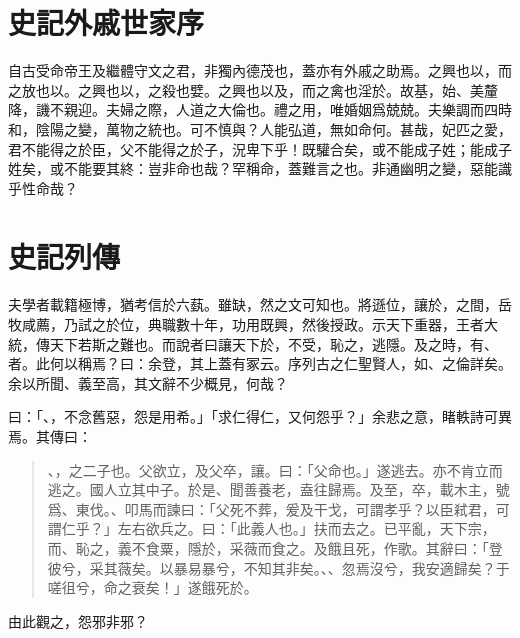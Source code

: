 \section[外戚世家序\quad{\small 史記}]{{\normalsize 史記}\quad 外戚世家序}
自古受命帝王及繼體守文之君，非獨內德茂也，蓋亦有外戚之助焉。之興也以，而之放也以。之興也以，之殺也嬖。之興也以及，而之禽也淫於。故基，始、美釐降，譏不親迎。夫婦之際，人道之大倫也。禮之用，唯婚姻爲兢兢。夫樂調而四時和，陰陽之變，萬物之統也。可不慎與？人能弘道，無如命何。甚哉，妃匹之愛，君不能得之於臣，父不能得之於子，況卑下乎！既驩合矣，或不能成子姓；能成子姓矣，或不能要其終：豈非命也哉？罕稱命，蓋難言之也。非通幽明之變，惡能識乎性命哉？

\theendnotes

\section[伯夷列傳\quad{\small 史記}]{{\normalsize 史記}\quad{}列傳}
夫學者載籍極博，猶考信於六蓺。雖缺，然之文可知也。將遜位，讓於，之間，岳牧咸薦，乃試之於位，典職數十年，功用既興，然後授政。示天下重器，王者大統，傳天下若斯之難也。而說者曰讓天下於，不受，恥之，逃隱。及之時，有、者。此何以稱焉？曰：余登，其上蓋有冢云。序列古之仁聖賢人，如、之倫詳矣。余以所聞、義至高，其文辭不少概見，何哉？

曰：「、，不念舊惡，怨是用希。」「求仁得仁，又何怨乎？」余悲之意，睹軼詩可異焉。其傳曰：
\begin{quotation}
、，之二子也。父欲立，及父卒，讓。曰：「父命也。」遂逃去。亦不肯立而逃之。國人立其中子。於是、聞善養老，盍往歸焉。及至，卒，載木主，號爲、東伐。、叩馬而諫曰：「父死不葬，爰及干戈，可謂孝乎？以臣弒君，可謂仁乎？」左右欲兵之。曰：「此義人也。」扶而去之。已平亂，天下宗，而、恥之，義不食粟，隱於，采薇而食之。及餓且死，作歌。其辭曰：「登彼兮，采其薇矣。以暴易暴兮，不知其非矣。、、忽焉沒兮，我安適歸矣？于嗟徂兮，命之衰矣！」遂餓死於。
\end{quotation}
由此觀之，怨邪非邪？

